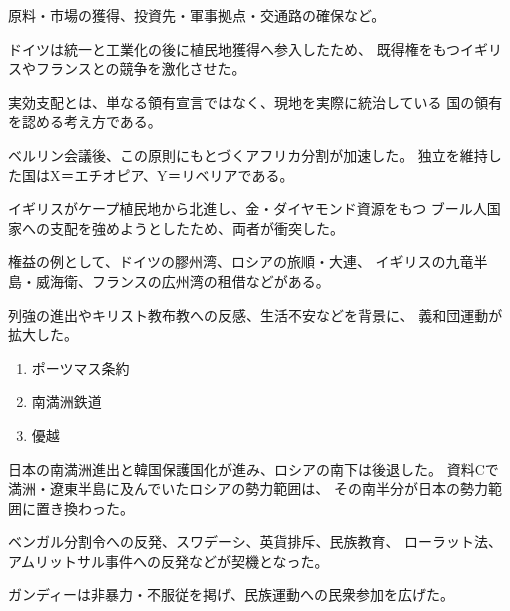 \documentclass[a4paper,11pt]{ltjsarticle}
\begin{document}
\begin{description}[
  style=nextline,
  leftmargin=0pt,
  labelindent=0pt
]

\item[第1問]

原料・市場の獲得、投資先・軍事拠点・交通路の確保など。

ドイツは統一と工業化の後に植民地獲得へ参入したため、
既得権をもつイギリスやフランスとの競争を激化させた。

\item[第2問]

実効支配とは、単なる領有宣言ではなく、現地を実際に統治している
国の領有を認める考え方である。

ベルリン会議後、この原則にもとづくアフリカ分割が加速した。
独立を維持した国はX＝エチオピア、Y＝リベリアである。

\item[第3問]

イギリスがケープ植民地から北進し、金・ダイヤモンド資源をもつ
ブール人国家への支配を強めようとしたため、両者が衝突した。

\item[第4問]

権益の例として、ドイツの膠州湾、ロシアの旅順・大連、
イギリスの九竜半島・威海衛、フランスの広州湾の租借などがある。

列強の進出やキリスト教布教への反感、生活不安などを背景に、
義和団運動が拡大した。

\item[第5問]

\begin{enumerate}[label=\textcircled{\arabic*}]
  \item ポーツマス条約
  \item 南満洲鉄道
  \item 優越
\end{enumerate}

日本の南満洲進出と韓国保護国化が進み、ロシアの南下は後退した。
資料Cで満洲・遼東半島に及んでいたロシアの勢力範囲は、
その南半分が日本の勢力範囲に置き換わった。

\item[第6問]

ベンガル分割令への反発、スワデーシ、英貨排斥、民族教育、
ローラット法、アムリットサル事件への反発などが契機となった。

ガンディーは非暴力・不服従を掲げ、民族運動への民衆参加を広げた。

\item[第7問]


\end{description}
\end{document}

